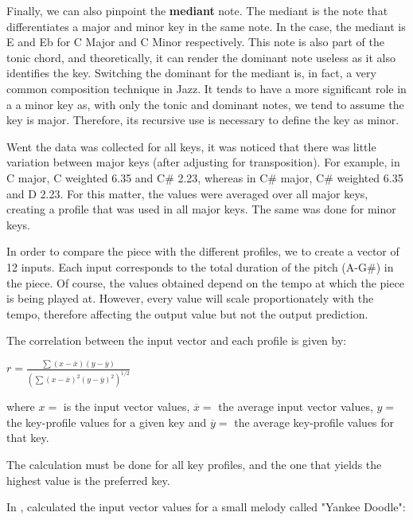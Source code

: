 Finally, we can also pinpoint the \textbf{mediant} note. The mediant is the note that differentiates a major and minor key in the same note.
In the case, the mediant is E and Eb for C Major and C Minor respectively. This note is also part of the tonic chord, and theoretically, it can render the dominant note useless as it also identifies the key.
Switching the dominant for the mediant is, in fact, a very common composition technique in Jazz.
It tends to have a more significant role in a a minor key as, with only the tonic and dominant notes, we tend to assume the key is major.
Therefore, its recursive use is necessary to define the key as minor.

Went the data was collected for all keys, it was noticed that there was little variation between major keys (after adjusting for transposition).
For example, in C major, C weighted 6.35 and C\# 2.23, whereas in C\# major, C\# weighted 6.35 and D 2.23.
For this matter, the values were averaged over all major keys, creating a profile that was used in all major keys.
The same was done for minor keys.

In order to compare the piece with the different profiles, we to create a vector of 12 inputs. Each input corresponds to the total duration of the pitch (A-G\#) in the piece.
Of course, the values obtained depend on the tempo at which the piece is being played at.
However, every value will scale proportionately with the tempo, therefore affecting the output value but not the output prediction.

The correlation between the input vector and each profile is given by:


\begin{center}
    \centering
    \(r = \frac{\sum{(x-\overline{x})(y-\overline{y})}}{(\sum{(x-\overline{x})^2(y-\overline{y})^2})^{1/2}}\)
\end{center}

where \(x = \) is the input vector values, \(\overline{x} = \) the average input vector values,
\(y = \) the key-profile values for a given key and \(\overline{y} = \) the average key-profile values for that key.

The calculation must be done for all key profiles, and the one that yields the highest value is the preferred key.

In \cite{Temperley2004Musicp}, \citeauthor{Temperley2004Musicp} calculated the input vector values for a small melody called "Yankee Doodle":

